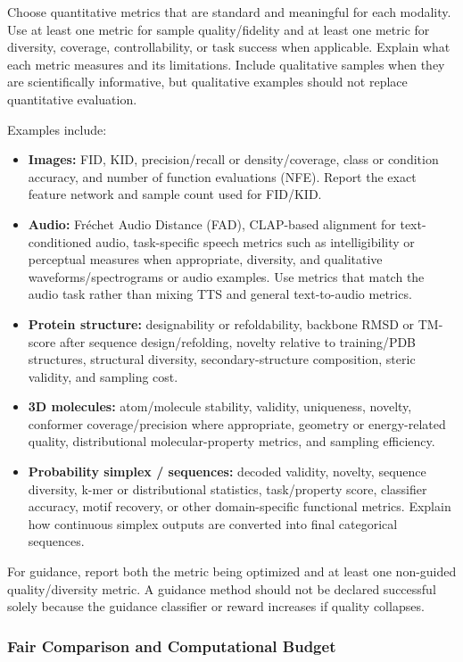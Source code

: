\documentclass{article}
\begin{document}
Choose quantitative metrics that are standard and meaningful for each modality. Use at least one metric for sample quality/fidelity and at least one metric for diversity, coverage, controllability, or task success when applicable. Explain what each metric measures and its limitations. Include qualitative samples when they are scientifically informative, but qualitative examples should not replace quantitative evaluation.

Examples include:
\begin{itemize}
    \item \textbf{Images:} FID, KID, precision/recall or density/coverage, class or condition accuracy, and number of function evaluations (NFE). Report the exact feature network and sample count used for FID/KID.
    \item \textbf{Audio:} Fr\'{e}chet Audio Distance (FAD), CLAP-based alignment for text-conditioned audio, task-specific speech metrics such as intelligibility or perceptual measures when appropriate, diversity, and qualitative waveforms/spectrograms or audio examples. Use metrics that match the audio task rather than mixing TTS and general text-to-audio metrics.
    \item \textbf{Protein structure:} designability or refoldability, backbone RMSD or TM-score after sequence design/refolding, novelty relative to training/PDB structures, structural diversity, secondary-structure composition, steric validity, and sampling cost.
    \item \textbf{3D molecules:} atom/molecule stability, validity, uniqueness, novelty, conformer coverage/precision where appropriate, geometry or energy-related quality, distributional molecular-property metrics, and sampling efficiency.
    \item \textbf{Probability simplex / sequences:} decoded validity, novelty, sequence diversity, k-mer or distributional statistics, task/property score, classifier accuracy, motif recovery, or other domain-specific functional metrics. Explain how continuous simplex outputs are converted into final categorical sequences.
\end{itemize}

For guidance, report both the metric being optimized and at least one non-guided quality/diversity metric. A guidance method should not be declared successful solely because the guidance classifier or reward increases if quality collapses.

\subsubsection{Fair Comparison and Computational Budget}
\end{document}
